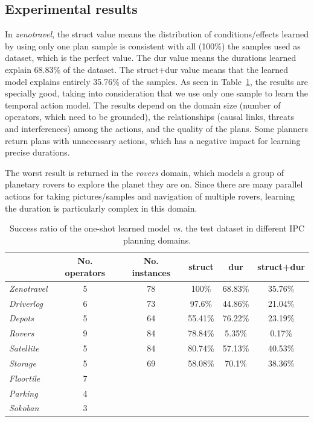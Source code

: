\documentclass[runningheads]{llncs}
\begin{document}
\subsection{Experimental results}
In \emph{zenotravel}, the struct value means the distribution of conditions/effects learned by using only one plan sample is consistent with all (100\%) the samples used as dataset, which is the perfect value. The dur value means the durations learned explain 68.83\% of the dataset. The struct+dur value means that the learned model explains entirely 35.76\% of the samples. As seen in Table~\ref{table:evaluationExperiments}, the results are specially good, taking into consideration that we use only one sample to learn the temporal action model. The results depend on the domain size (number of operators, which need to be grounded), the relationships (causal links, threats and interferences) among the actions, and the quality of the plans.  Some planners return plans with unnecessary actions, which has a negative impact for learning precise durations.

The worst result is returned in the \emph{rovers} domain, which models a group of planetary rovers to explore the planet they are on. Since there are many parallel actions for taking pictures/samples and navigation of multiple rovers, learning the duration is particularly complex in this domain.



\begin{table}
\begin{center}
\small
\begin{tabular}{p{2cm}ccccc}
 & No. operators & No. instances & struct & dur & struct+dur  \\

\hline

\emph{Zenotravel} & 5 & 78 & 100\% & 68.83\% & 35.76\% \\
\emph{Driverlog} & 6 & 73 & 97.6\% & 44.86\% & 21.04\% \\
\emph{Depots} & 5 & 64 & 55.41\% & 76.22\% & 23.19\% \\
\emph{Rovers} & 9 & 84 & 78.84\% & 5.35\% & 0.17\% \\
\emph{Satellite} & 5 & 84 & 80.74\% & 57.13\% & 40.53\% \\
\emph{Storage} & 5 & 69 & 58.08\% & 70.1\% & 38.36\% \\

\emph{Floortile} & 7 &\\
\emph{Parking} & 4 &\\
\emph{Sokoban} & 3 & \\

\hline
\end{tabular}
\normalsize
\end{center}
\caption{Success ratio of the one-shot learned model \emph{vs.} the test dataset in different IPC planning domains.}
\label{table:evaluationExperiments}
\end{table}
\end{document}
